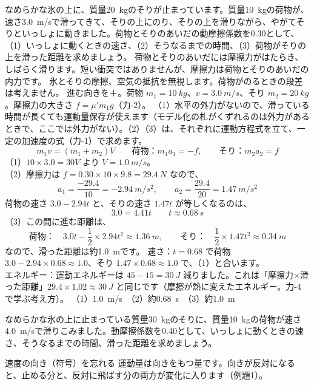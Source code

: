 \label{ph:力-3:ex16}
\begin{phreidai}[そりに荷物が滑りこむ]
なめらかな氷の上に、質量\qty{20}{kg}のそりが止まっています。質量\qty{10}{kg}の荷物が、速さ\qty{3.0}{m/s}で滑ってきて、そりの上にのり、そりの上を滑りながら、やがてそりといっしょに動きました。荷物とそりのあいだの動摩擦係数を0.30として、（1）いっしょに動くときの速さ、（2）そうなるまでの時間、（3）荷物がそりの上を滑った距離を求めましょう。
\phbamen
荷物とそりのあいだには摩擦力がはたらき、しばらく滑ります。短い衝突ではありませんが、摩擦力は荷物とそりのあいだの内力です。
\phmushi
氷とそりの摩擦、空気の抵抗を無視します。荷物がのるときの段差は考えません。
\phzu
進む向きを＋。荷物 $m_1=\qty{10}{kg}$、$v=\qty{3.0}{m/s}$、そり $m_2=\qty{20}{kg}$。摩擦力の大きさ $f=\mu'm_1g$（力-2）。
\phriyu
（1）水平の外力がないので、滑っている時間が長くても運動量保存が使えます（モデル化の札がくずれるのは外力があるときで、ここでは外力がない）。（2）（3）は、それぞれに運動方程式を立て、一定の加速度の式（力-1）で求めます。
\phtateru
\[m_1v=(m_1+m_2)V\qquad \text{荷物：}m_1a_1=-f,\qquad \text{そり：}m_2a_2=f\]
\phtoku
（1）$10\times3.0=30V$ より $V=\qty{1.0}{m/s}$。\\
（2）摩擦力は $f=0.30\times10\times9.8=\qty{29.4}{N}$ なので、
\[a_1=\frac{-29.4}{10}=\qty{-2.94}{m/s^2},\qquad a_2=\frac{29.4}{20}=\qty{1.47}{m/s^2}\]
荷物の速さ $3.0-2.94t$ と、そりの速さ $1.47t$ が等しくなるのは、
\[3.0=4.41t\qquad t\approx\qty{0.68}{s}\]
（3）この間に進む距離は、
\[\text{荷物：}\quad 3.0t-\frac{1}{2}\times2.94t^2\approx\qty{1.36}{m},\qquad \text{そり：}\quad\frac{1}{2}\times1.47t^2\approx\qty{0.34}{m}\]
なので、滑った距離は約\qty{1.0}{m}です。
\phtashikame
速さ：$t=0.68$ で荷物 $3.0-2.94\times0.68\approx1.0$、そり $1.47\times0.68\approx1.0$ で、（1）と合います。\\
エネルギー：運動エネルギーは $45-15=\qty{30}{J}$ 減りました。これは「摩擦力×滑った距離」$29.4\times1.02\approx\qty{30}{J}$ と同じです（摩擦が熱に変えたエネルギー。力-4 で学ぶ考え方）。
\kotae （1）\qty{1.0}{m/s}　（2）約\qty{0.68}{s}　（3）約\qty{1.0}{m}
\end{phreidai}
\begin{jibun}
なめらかな氷の上に止まっている質量\qty{30}{kg}のそりに、質量\qty{10}{kg}の荷物が速さ\qty{4.0}{m/s}で滑りこみました。動摩擦係数を0.40として、いっしょに動くときの速さ、そうなるまでの時間、滑った距離を求めましょう。
\end{jibun}

\begin{tsumazuki}{速度の向き（符号）を忘れる}
運動量は向きをもつ量です。向きが反対になると、止める分と、反対に飛ばす分の両方が変化に入ります（例題1）。
\end{tsumazuki}

